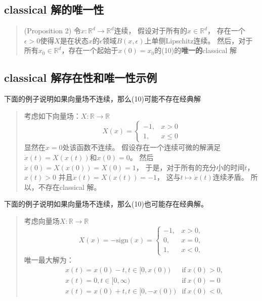 \subsection{classical
解的唯一性}\label{classical-ux89e3ux7684ux552fux4e00ux6027}

\begin{quote}
(Proposition 2) 令\(x:\mathbb{R}^d\to\mathbb{R}^d\)连续，
假设对于所有的\(x\in\mathbb{R}^d\)，
存在一个\(\epsilon>0\)使得\(X\)是在状态\(x\)的\(\epsilon\)领域\(B(x,\epsilon)\)上单侧Lipschitz连续。
然后，对于所有\(x_0\in \mathbb{R}^d\)，存在一个起始于\(x(0)=x_0\)的(10)的\textbf{唯一的}classical
解
\end{quote}

\subsection{classical
解存在性和唯一性示例}\label{classical-ux89e3ux5b58ux5728ux6027ux548cux552fux4e00ux6027ux793aux4f8b}

下面的例子说明如果向量场不连续，那么(10)可能不存在经典解

\begin{quote}
考虑如下向量场：\(X:\mathbb{R}\to\mathbb{R}\) \[
X(x)=\begin{cases}
-1, & x>0\\
1 , & x\leq 0
\end{cases}
\] 显然在\(x=0\)处该函数不连续。
假设存在一个连续可微的解满足\(\dot{x}(t)=X(x(t))\)和\(x(0)=0\)。
然后\(\dot{x}(0)=X(x(0))=X(0)=1\)，
于是，对于所有的充分小的时间\(t\)，\(x(t)>0\)
并且\(\dot{x}(t)=X(x(t))=-1\)， 这与\(t\mapsto \dot{x}(t)\)连续矛盾。
所以，不存在classical 解。
\end{quote}

下面的例子说明如果向量场不连续，那么(10)也可能存在经典解。

\begin{quote}
考虑向量场\(X:\mathbb{R}\to\mathbb{R}\) \[
X(x)=-\mathrm{sign}(x)=\begin{cases}
-1, & x>0,\\
0,   & x=0,\\
1,   & x<0,
\end{cases}
\] 唯一最大解为： \[
\begin{aligned}
&x(t)=x(0)-t, 
t\in [0,x(0)) 
&\textrm{if}
\ x(0)>0, \\
&x(t)=0,  t\in [0,\infty)
&\textrm{if}\ x(0)=0 
\\
&x(t)=x(0)+t,  t\in [0,-x(0))
&\textrm{if}\ 
x(0)<0,
\end{aligned}
\]
\end{quote}

